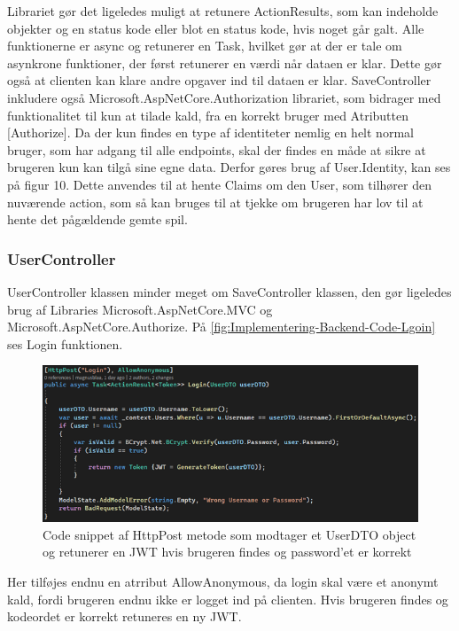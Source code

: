 Librariet gør det ligeledes muligt at retunere ActionResults, som kan indeholde objekter og en status kode eller blot en status kode, hvis noget går galt. Alle funktionerne er async og retunerer en Task, hvilket gør at der er tale om asynkrone funktioner, der først retunerer en værdi når dataen er klar. Dette gør også at clienten kan klare andre opgaver ind til dataen er klar.
SaveController inkludere også Microsoft.AspNetCore.Authorization librariet, som bidrager med funktionalitet til kun at tilade kald, fra en korrekt bruger med Atributten [Authorize]. Da der kun findes en type af identiteter nemlig en helt normal bruger, som har adgang til alle endpoints, skal der findes en måde at sikre at brugeren kun kan tilgå sine egne data. Derfor gøres brug af User.Identity, kan ses på figur 10. Dette anvendes til at hente Claims om den User, som tilhører den nuværende action, som så kan bruges til at tjekke om brugeren har lov til at hente det pågældende gemte spil.\\
    

\subsubsection{UserController}

UserController klassen minder meget om SaveController klassen, den gør ligeledes brug af Libraries Microsoft.AspNetCore.MVC og Microsoft.AspNetCore.Authorize. På \autoref{fig:Implementering-Backend-Code-Lgoin} ses Login funktionen.

\begin{figure}[H]
\centering
\includegraphics[width = \textwidth]{02-Body/Images/Backend_Code_Login.PNG}
\caption{Code snippet af HttpPost metode som modtager et UserDTO object og retunerer en JWT hvis brugeren findes og password’et er korrekt}
\label{fig:Implementering-Backend-Code-Lgoin}
\end{figure}

Her tilføjes endnu en atrribut AllowAnonymous, da login skal være et anonymt kald, fordi brugeren endnu ikke er logget ind på clienten. Hvis brugeren findes og kodeordet er korrekt retuneres en ny JWT.\\

